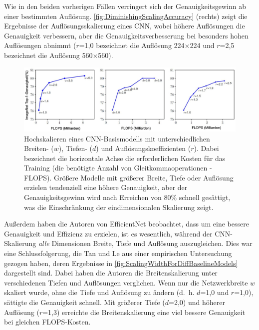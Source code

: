 \begin{description}
	Wie in den beiden vorherigen Fällen verringert sich der Genauigkeitsgewinn ab einer bestimmten Auflösung. \autoref{fig:DiminishingScalingAccuracy} (rechts) zeigt die Ergebnisse der Auflösungsskalierung eines CNN, wobei höhere Auflösungen die Genauigkeit verbessern, aber die Genauigkeitsverbesserung bei besonders hohen Auflösungen abnimmt ($r$=1,0 bezeichnet die Auflösung 224$\times$224 und $r$=2,5 bezeichnet die Auflösung 560$\times$560).
\end{description}

\begin{figure}[!hb]
	\centering
	\includegraphics[width=\linewidth]{images/DiminishingScalingAccuracy}
	\caption{Hochskalieren eines CNN-Basismodells mit unterschiedlichen Breiten- ($w$), Tiefen- ($d$) und Auflösungskoeffizienten ($r$). Dabei bezeichnet die horizontale Achse die erforderlichen Kosten für das Training (die benötigte Anzahl von Gleitkommaoperationen - FLOPS). Größere Modelle mit größerer Breite, Tiefe oder Auflösung erzielen tendenziell eine höhere Genauigkeit, aber der Genauigkeitsgewinn wird nach Erreichen von 80\% schnell gesättigt, was die Einschränkung der eindimensionalen Skalierung zeigt. \protect\cite{tan2020efficientnet}}
	\label{fig:DiminishingScalingAccuracy}
\end{figure}

Außerdem haben die Autoren von EfficientNet beobachtet, dass um eine bessere Genauigkeit und Effizienz zu erzielen, ist es wesentlich, während der CNN-Skalierung \textit{alle} Dimensionen Breite, Tiefe und Auflösung auszugleichen. Dies war eine Schlussfolgerung, die Tan und Le aus einer empirischen Untersuchung gezogen haben, deren Ergebnisse in \autoref{fig:ScalingWidthForDiffBaselineModels} dargestellt sind. Dabei haben die Autoren die Breitenskalierung unter verschiedenen Tiefen und Auflösungen verglichen. Wenn nur die Netzwerkbreite $w$ skaliert wurde, ohne die Tiefe und Auflösung zu ändern (d.~h. $d$=1,0 und $r$=1,0), sättigte die Genauigkeit schnell. Mit größerer Tiefe ($d$=2,0) und höherer Auflösung ($r$=1,3) erreichte die Breitenskalierung eine viel bessere Genauigkeit bei gleichen FLOPS-Kosten.

